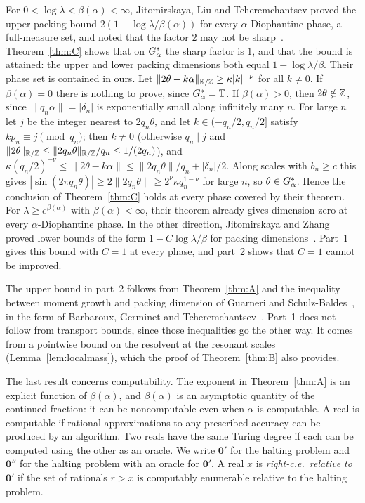 For $0<\log\lambda<\beta(\alpha)<\infty$, Jitomirskaya, Liu and Tcheremchantsev proved the upper packing bound $2(1-\log\lambda/\beta(\alpha))$ for every $\alpha$-Diophantine phase, a full-measure set, and noted that the factor $2$ may not be sharp~\cite[Theorem~1.1 and Remark~1.1]{JLT2025}. Theorem~\ref{thm:C} shows that on $G_\alpha^*$ the sharp factor is $1$, and that the bound is attained: the upper and lower packing dimensions both equal $1-\log\lambda/\beta$. Their phase set is contained in ours. Let $\|2\theta-k\alpha\|_{\mathbb R/\mathbb Z}\ge\kappa|k|^{-\nu}$ for all $k\ne0$. If $\beta(\alpha)=0$ there is nothing to prove, since $G_\alpha^*=\mathbb T$. If $\beta(\alpha)>0$, then $2\theta\notin\mathbb Z$, since $\|q_n\alpha\|=|\delta_n|$ is exponentially small along infinitely many $n$. For large $n$ let $j$ be the integer nearest to $2q_n\theta$, and let $k\in(-q_n/2,q_n/2]$ satisfy $kp_n\equiv j\pmod{q_n}$; then $k\ne0$ (otherwise $q_n\mid j$ and $\|2\theta\|_{\mathbb R/\mathbb Z}\le\|2q_n\theta\|_{\mathbb R/\mathbb Z}/q_n\le1/(2q_n)$), and $\kappa(q_n/2)^{-\nu}\le\|2\theta-k\alpha\|\le\|2q_n\theta\|/q_n+|\delta_n|/2$. Along scales with $b_n\ge c$ this gives $|\sin(2\pi q_n\theta)|\ge2\|2q_n\theta\|\ge2^{\nu}\kappa q_n^{1-\nu}$ for large $n$, so $\theta\in G_\alpha^*$. Hence the conclusion of Theorem~\ref{thm:C} holds at every phase covered by their theorem. For $\lambda\ge e^{\beta(\alpha)}$ with $\beta(\alpha)<\infty$, their theorem already gives dimension zero at every $\alpha$-Diophantine phase. In the other direction, Jitomirskaya and Zhang proved lower bounds of the form $1-C\log\lambda/\beta$ for packing dimensions~\cite{JZ2022}. Part~1 gives this bound with $C=1$ at every phase, and part~2 shows that $C=1$ cannot be improved.

The upper bound in part~2 follows from Theorem~\ref{thm:A} and the inequality between moment growth and packing dimension of Guarneri and Schulz-Baldes~\cite{GSB1999}, in the form of Barbaroux, Germinet and Tcheremchantsev~\cite{BGT2000}. Part~1 does not follow from transport bounds, since those inequalities go the other way. It comes from a pointwise bound on the resolvent at the resonant scales (Lemma~\ref{lem:localmass}), which the proof of Theorem~\ref{thm:B} also provides.

The last result concerns computability. The exponent in Theorem~\ref{thm:A} is an explicit function of $\beta(\alpha)$, and $\beta(\alpha)$ is an asymptotic quantity of the continued fraction: it can be noncomputable even when $\alpha$ is computable. A real is computable if rational approximations to any prescribed accuracy can be produced by an algorithm. Two reals have the same Turing degree if each can be computed using the other as an oracle. We write $\mathbf0'$ for the halting problem and $\mathbf0''$ for the halting problem with an oracle for $\mathbf0'$. A real $x$ is \emph{right-c.e.\ relative to $\mathbf 0'$} if the set of rationals $r>x$ is computably enumerable relative to the halting problem.

